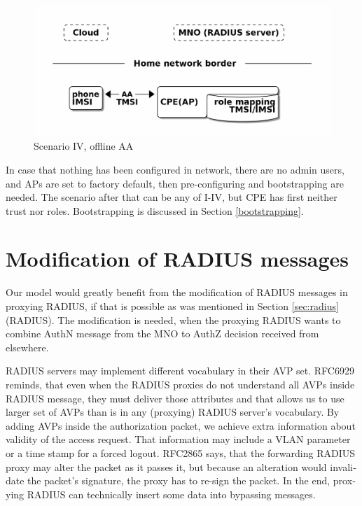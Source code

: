 \documentclass[12pt,a4paper,english]{tutthesis}
\begin{document}
\begin{otherlanguage}{english}
\begin{figure}[htb]
\centering
\includegraphics[width=.9\linewidth]{scenIV.png}
\caption{\label{fig:scenario-IV}Scenario IV, offline AA}
\end{figure}







In case that nothing has been configured in network, there are no 
admin users, and APs are set to factory default, then 
pre-configuring and bootstrapping are needed. The scenario after that can be any
of I-IV, but CPE  has first neither trust nor roles. Bootstrapping is discussed in 
Section \ref{bootstrapping}.


\section{Modification of RADIUS messages}
\label{sec-4-3}
\label{sec:radius-macs}

Our model would greatly benefit from the modification of RADIUS messages in proxying
RADIUS, if that is possible as was mentioned in Section \ref{sec:radius}(RADIUS).
The modification is needed, when the proxying RADIUS wants to combine AuthN message
from the MNO to AuthZ decision received from elsewhere.




RADIUS servers may implement different vocabulary in their AVP set.
RFC6929 \cite{rfc6929} reminds, that even when
the RADIUS proxies do not understand all AVPs inside RADIUS message, they
must deliver those attributes and that allows us to use larger set of AVPs 
than is in any (proxying) RADIUS server's vocabulary.
By adding AVPs inside the authorization packet, we achieve extra
information about validity of the access request.
That information may include a VLAN parameter or a time stamp for a forced
logout.
RFC2865 \cite{rfc2865} says, that the forwarding RADIUS proxy may alter
the packet as it passes it, but because an alteration would invalidate the
packet's signature, the proxy has to re-sign the packet.
In the end, proxying RADIUS can technically insert some data into 
bypassing messages.






\end{otherlanguage}
\end{document}
